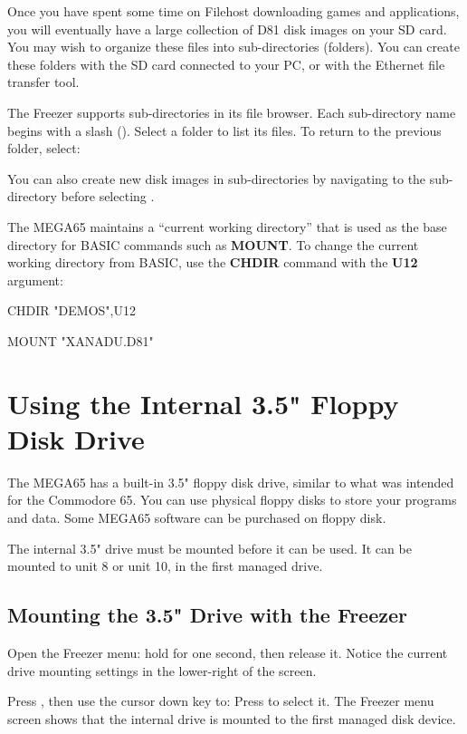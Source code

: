 Once you have spent some time on Filehost downloading games and applications, you will eventually have a large collection of D81 disk images on your SD card. You may wish to organize these files into sub-directories (folders). You can create these folders with the SD card connected to your PC, or with the Ethernet file transfer tool.

The Freezer supports sub-directories in its file browser. Each sub-directory name begins with a slash (\screentext{/}). Select a folder to list its files. To return to the previous folder, select: 

You can also create new disk images in sub-directories by navigating to the sub-directory before selecting .

The MEGA65 maintains a ``current working directory'' that is used as the base directory for BASIC commands such as {\bf MOUNT}. To change the current working directory from BASIC, use the {\bf CHDIR} command with the {\bf U12} argument:

\begin{screencode}
CHDIR "DEMOS",U12

MOUNT "XANADU.D81"
\end{screencode}


\section{Using the Internal 3.5" Floppy Disk Drive}

The MEGA65 has a built-in 3.5" floppy disk drive, similar to what was intended for the Commodore 65. You can use physical floppy disks to store your programs and data. Some MEGA65 software can be purchased on floppy disk.

The internal 3.5" drive must be mounted before it can be used. It can be mounted to unit 8 or unit 10, in the first managed drive.

\subsection{Mounting the 3.5" Drive with the Freezer}

Open the Freezer menu: hold  for one second, then release it. Notice the current drive mounting settings in the lower-right of the screen.

Press , then use the cursor down key to:  Press  to select it. The Freezer menu screen shows that the internal drive is mounted to the first managed disk device.

